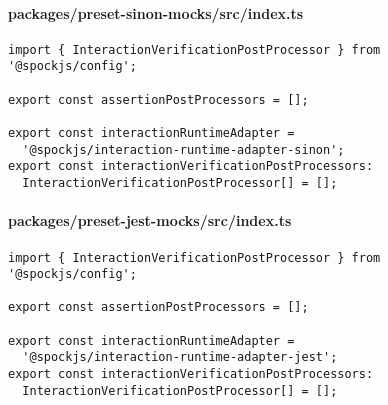 \paragraph*{packages/preset-sinon-mocks/src/index.ts}
\begin{verbatim}
import { InteractionVerificationPostProcessor } from '@spockjs/config';

export const assertionPostProcessors = [];

export const interactionRuntimeAdapter =
  '@spockjs/interaction-runtime-adapter-sinon';
export const interactionVerificationPostProcessors:
  InteractionVerificationPostProcessor[] = [];
\end{verbatim}

\paragraph*{packages/preset-jest-mocks/src/index.ts}
\begin{verbatim}
import { InteractionVerificationPostProcessor } from '@spockjs/config';

export const assertionPostProcessors = [];

export const interactionRuntimeAdapter =
  '@spockjs/interaction-runtime-adapter-jest';
export const interactionVerificationPostProcessors:
  InteractionVerificationPostProcessor[] = [];
\end{verbatim}

